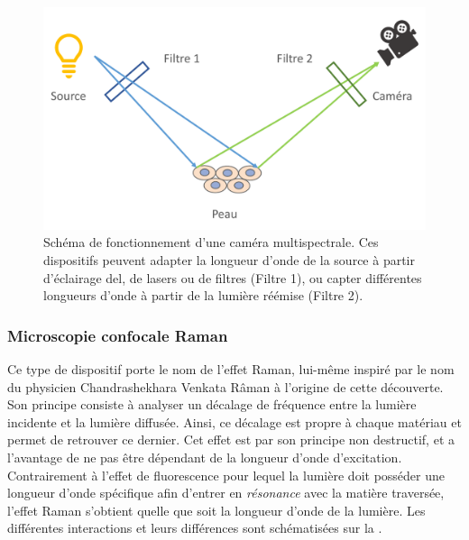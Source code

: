 \begin{figure}[H]
    \centering
    \includegraphics[width=\linewidth]{contents/chapter_2/resources/scheme_multispectral_principle.pdf}
    \caption{Schéma de fonctionnement d'une caméra multispectrale. Ces dispositifs peuvent adapter la longueur d'onde de la source à partir d'éclairage \gls{del}, de lasers ou de filtres (Filtre 1), ou capter différentes longueurs d'onde à partir de la lumière réémise (Filtre 2).}
    \label{fig:scheme_multispectral_principle}
\end{figure}\par

\subsubsection{Microscopie confocale Raman}
Ce type de dispositif porte le nom de l'effet Raman, lui-même inspiré par le nom du physicien Chandrashekhara Venkata Râman à l'origine de cette découverte. Son principe consiste à analyser un décalage de fréquence entre la lumière incidente et la lumière diffusée. Ainsi, ce décalage est propre à chaque matériau et permet de retrouver ce dernier. Cet effet est par son principe non destructif, et a l'avantage de ne pas être dépendant de la longueur d'onde d'excitation. Contrairement à l'effet de fluorescence pour lequel la lumière doit posséder une longueur d'onde spécifique afin d'entrer en \textit{résonance} avec la matière traversée, l'effet Raman s'obtient quelle que soit la longueur d'onde de la lumière. Les différentes interactions et leurs différences sont schématisées sur la .\par

